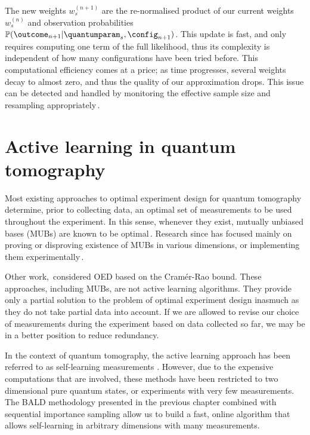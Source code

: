 The new weights $w^{(n+1)}_s$ are the re-normalised product of our current weights $w^{(n)}_s$ and observation probabilities $\mathbb{P}(\outcome_{n+1}\vert\quantumparam_s,\config_{n+1})$. This update is fast, and only requires computing one term of the full likelihood, thus its complexity is independent of how many configurations have been tried before. This computational efficiency comes at a price; as time progresses, several weights decay to almost zero, and thus the quality of our approximation drops. This issue can be detected and handled by monitoring the effective sample size and resampling appropriately\,\citep{SMCBook}.


\section{Active learning in quantum tomography}

Most existing approaches to optimal experiment design for quantum tomography determine, prior to collecting data, an optimal set of measurements to be used throughout the experiment. In this sense, whenever they exist, mutually unbiased bases (MUBs) are known to be optimal\,\citep{MUBFirst,MUBExperiment}. Research since has focused mainly on proving or disproving existence of MUBs in various dimensions, or implementing them experimentally\,\citep{DimensionSix,MUBQutrit,MUBExperiment}.

Other work,\,\citep{OEDFirst,OEDAverage} considered OED based on the Cram\'{e}r-Rao bound. These approaches, including MUBs, are not active learning algorithms. They provide only a partial solution to the problem of optimal experiment design inasmuch as they do not take partial data into account. If we are allowed to revise our choice of measurements during the experiment based on data collected so far, we may be in a better position to reduce redundancy.

In the context of quantum tomography, the active learning approach has been referred to as self-learning measurements \citep{SelfLearning, SelfLearningExperimental}. However, due to the expensive computations that are involved, these methods have been restricted to two dimensional pure quantum states, or experiments with very few measurements. The BALD methodology presented in the previous chapter combined with sequential importance sampling allow us to build a fast, online algorithm that allows self-learning in arbitrary dimensions with many measurements. 

